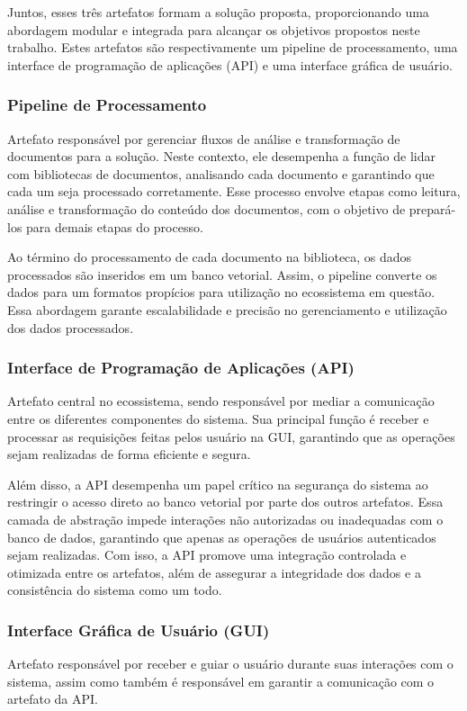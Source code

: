 \documentclass[a4paper, 12pt]{article}
\begin{document}
    Juntos, esses três artefatos formam a solução proposta, proporcionando uma abordagem modular e integrada para alcançar os objetivos propostos neste trabalho. Estes artefatos são respectivamente um pipeline de processamento, uma interface de programação de aplicações (API) e uma interface gráfica de usuário.
    
    \subsubsection{Pipeline de Processamento}

    Artefato responsável por gerenciar fluxos de análise e transformação de documentos para a solução. Neste contexto, ele desempenha a função de lidar com bibliotecas de documentos, analisando cada documento e garantindo que cada um seja processado corretamente. Esse processo envolve etapas como leitura, análise e transformação do conteúdo dos documentos, com o objetivo de prepará-los para demais etapas do processo.  

    Ao término do processamento de cada documento na biblioteca, os dados processados são inseridos em um banco vetorial. Assim, o pipeline converte os dados para um formatos propícios para utilização no ecossistema em questão. Essa abordagem garante escalabilidade e precisão no gerenciamento e utilização dos dados processados.
    
    \subsubsection{Interface de Programação de Aplicações (API)}

    Artefato central no ecossistema, sendo responsável por mediar a comunicação entre os diferentes componentes do sistema. Sua principal função é receber e processar as requisições feitas pelos usuário na GUI, garantindo que as operações sejam realizadas de forma eficiente e segura.

    Além disso, a API desempenha um papel crítico na segurança do sistema ao restringir o acesso direto ao banco vetorial por parte dos outros artefatos. Essa camada de abstração impede interações não autorizadas ou inadequadas com o banco de dados, garantindo que apenas as operações de usuários autenticados sejam realizadas. Com isso, a API promove uma integração controlada e otimizada entre os artefatos, além de assegurar a integridade dos dados e a consistência do sistema como um todo.
    
    \subsubsection{Interface Gráfica de Usuário (GUI)}
    Artefato responsável por receber e guiar o usuário durante suas interações com o sistema, assim como também é responsável em garantir a comunicação com o artefato da API.
\end{document}

